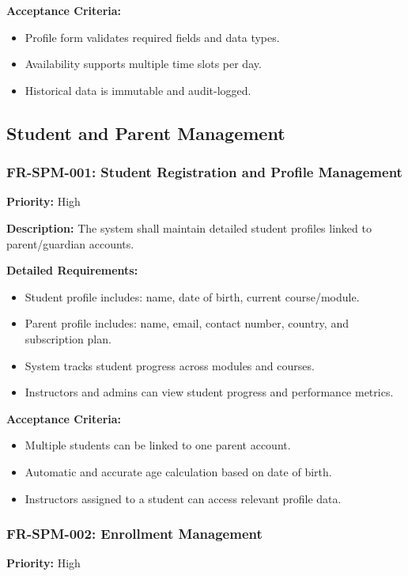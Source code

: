 \textbf{Acceptance Criteria:}
\begin{itemize}
    \item Profile form validates required fields and data types.
    \item Availability supports multiple time slots per day.
    \item Historical data is immutable and audit-logged.
\end{itemize}

\subsection{Student and Parent Management}

\subsubsection{FR-SPM-001: Student Registration and Profile Management}
\textbf{Priority:} High  

\textbf{Description:} The system shall maintain detailed student profiles linked to parent/guardian accounts.

\textbf{Detailed Requirements:}
\begin{itemize}
    \item Student profile includes: name, date of birth, current course/module.
    \item Parent profile includes: name, email, contact number, country, and subscription plan.
    \item System tracks student progress across modules and courses.
    \item Instructors and admins can view student progress and performance metrics.
\end{itemize}

\textbf{Acceptance Criteria:}
\begin{itemize}
    \item Multiple students can be linked to one parent account.
    \item Automatic and accurate age calculation based on date of birth.
    \item Instructors assigned to a student can access relevant profile data.
\end{itemize}

\subsubsection{FR-SPM-002: Enrollment Management}
\textbf{Priority:} High  


